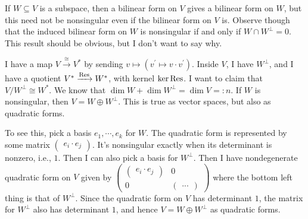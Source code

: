 If $W\subseteq V$ is a subspace, then a bilinear form on $V$ gives a bilinear form on $W$, but this need not be nonsingular even if the bilinear form on $V$ is. Observe though that the induced bilinear form on $W$ is nonsingular if and only if $W\cap W^\perp=0$. This result should be obvious, but I don't want to say why.

I have a map $V\xrightarrow{\cong} V^\ast$ by sending $v\mapsto(v^\prime\mapsto v\cdot v^\prime)$. Inside $V$, I have $W^\perp$, and I have a quotient $V^\ast\xrightarrow{\operatorname{Res}} W^\ast$, with kernel $\ker\operatorname{Res}$. I want to claim that $V/W^\perp\cong W^\ast$. We know that $\dim W+\dim W^\perp=\dim V=:n$. If $W$ is nonsingular, then $V=W\oplus W^\perp$. This is true as vector spaces, but also as quadratic forms.

To see this, pick a basis $e_1,\cdots,e_k$ for $W$. The quadratic form is represented by some matrix $\begin{pmatrix} e_i\cdot e_j \end{pmatrix}$. It's nonsingular exactly when its determinant is nonzero, i.e., $1$. Then I can also pick a basis for $W^\perp$. Then I have nondegenerate quadratic form on $V$ given by $\begin{pmatrix}\begin{pmatrix} e_i\cdot e_j \end{pmatrix} & 0 \\ 0 & \begin{pmatrix} ... \end{pmatrix}\end{pmatrix}$ where the bottom left thing is that of $W^\perp$. Since the quadratic form on $V$ has determinant $1$, the matrix for $W^\perp$ also has determinant $1$, and hence $V=W\oplus W^\perp$ as quadratic forms.

